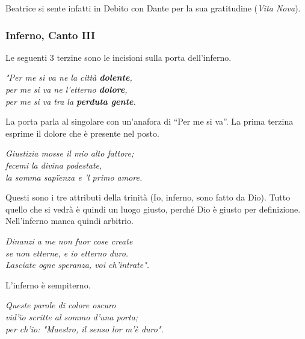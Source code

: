 \documentclass[a4paper]{article}
\newcommand{\quotes}[1]{``#1''}
\newcommand\hr{\par\vspace{-.5\ht\strutbox}\noindent\hrulefill\par\vspace{0.15cm}}
\begin{document}
Beatrice si sente infatti in Debito con Dante per la sua gratitudine (\textit{Vita Nova}).

\pagebreak

\subsubsection{Inferno, Canto III}

\hr

Le seguenti 3 terzine sono le incisioni sulla porta dell'inferno.

\begin{center}
    \textit{"Per me si va ne la città \textbf{dolente},} \\
    \textit{per me si va ne l'etterno \textbf{dolore},} \\
    \textit{per me si va tra la \textbf{perduta gente}.}
\end{center}

La porta parla al singolare con un'anafora di \quotes{Per me si va}.
La prima terzina esprime il dolore che è presente nel posto.

\begin{center}
    \textit{Giustizia mosse il mio alto fattore;} \\
    \textit{fecemi la divina podestate,} \\
    \textit{la somma sapïenza e 'l primo amore.}
\end{center}

Questi sono i tre attributi della trinità (Io, inferno, sono fatto da Dio).
Tutto quello che si vedrà è quindi un luogo giusto, perché Dio è giusto per definizione.
Nell'inferno manca quindi arbitrio.

\begin{center}
    \textit{Dinanzi a me non fuor cose create} \\
    \textit{se non etterne, e io etterno duro.} \\
    \textit{Lasciate ogne speranza, voi ch'intrate".}
\end{center}

L'inferno è sempiterno.

\hr

\begin{center}
    \textit{Queste parole di colore oscuro} \\
    \textit{vid'ïo scritte al sommo d'una porta;} \\
    \textit{per ch'io: "Maestro, il senso lor m'è duro".}
\end{center}
\end{document}
